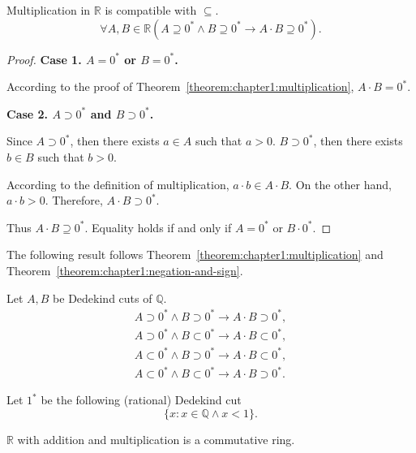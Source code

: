 \begin{theorem}
    Multiplication in $\mathbb{R}$ is compatible with $\subseteq$.
    \[
        \forall A, B\in\mathbb{R}(A\supseteq {0}^{*}\land B\supseteq {0}^{*}\rightarrow A\cdot B\supseteq {0}^{*}).
    \]
\end{theorem}

\begin{proof}
    \textbf{Case 1. $A = {0}^{*}$ or $B = {0}^{*}$.}

    According to the proof of Theorem~\ref{theorem:chapter1:multiplication}, $A\cdot B = {0}^{*}$.

    \textbf{Case 2. $A\supset {0}^{*}$ and $B\supset {0}^{*}$.}

    Since $A\supset {0}^{*}$, then there exists $a\in A$ such that $a > 0$. $B\supset {0}^{*}$, then there exists $b\in B$ such that $b > 0$.

    According to the definition of multiplication, $a\cdot b\in A\cdot B$. On the other hand, $a\cdot b > 0$. Therefore, $A\cdot B\supset {0}^{*}$.

    Thus $A\cdot B\supseteq {0}^{*}$. Equality holds if and only if $A = {0}^{*}$ or $B\cdot {0}^{*}$.
\end{proof}

The following result follows Theorem~\ref{theorem:chapter1:multiplication} and Theorem~\ref{theorem:chapter1:negation-and-sign}.

\begin{corollary}
    Let $A, B$ be Dedekind cuts of $\mathbb{Q}$.
    \[
        \begin{split}
            A\supset {0}^{*}\land B\supset {0}^{*}\rightarrow A\cdot B\supset {0}^{*}, \\
            A\supset {0}^{*}\land B\subset {0}^{*}\rightarrow A\cdot B\subset {0}^{*}, \\
            A\subset {0}^{*}\land B\supset {0}^{*}\rightarrow A\cdot B\subset {0}^{*}, \\
            A\subset {0}^{*}\land B\subset {0}^{*}\rightarrow A\cdot B\supset {0}^{*}.
        \end{split}
    \]
\end{corollary}

Let ${1}^{*}$ be the following (rational) Dedekind cut
\[
    \{ x: x\in\mathbb{Q}\land x < 1 \}.
\]

\begin{theorem}
    $\mathbb{R}$ with addition and multiplication is a commutative ring.
\end{theorem}

